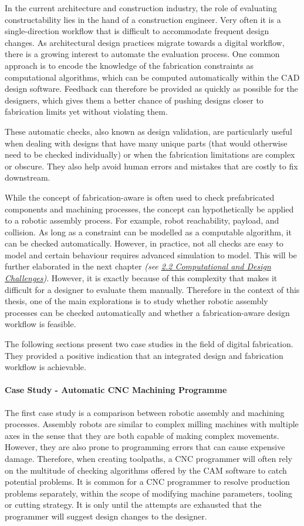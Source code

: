 \documentclass[11pt]{book}
\begin{document}
In the current architecture and construction industry, the role of evaluating constructability lies in the hand of a construction engineer. Very often it is a single-direction workflow that is difficult to accommodate frequent design changes. As architectural design practices migrate towards a digital workflow, there is a growing interest to automate the evaluation process. One common approach is to encode the knowledge of the fabrication constraints as computational algorithms, which can be computed automatically within the CAD design software. Feedback can therefore be provided as quickly as possible for the designers, which gives them a better chance of pushing designs closer to fabrication limits yet without violating them. 

These automatic checks, also known as design validation, are particularly useful when dealing with designs that have many unique parts (that would otherwise need to be checked individually) or when the fabrication limitations are complex or obscure. They also help avoid human errors and mistakes that are costly to fix downstream. 

While the concept of fabrication-aware is often used to check prefabricated components and machining processes, the concept can hypothetically be applied to a robotic assembly process. For example, robot reachability, payload, and collision. As long as a constraint can be modelled as a computable algorithm, it can be checked automatically. However, in practice, not all checks are easy to model and certain behaviour requires advanced simulation to model. This will be further elaborated in the next chapter \textit{(see \uline{2.2 Computational and Design Challenges})}. However, it is exactly because of this complexity that makes it difficult for a designer to evaluate them manually. Therefore in the context of this thesis, one of the main explorations is to study whether robotic assembly processes can be checked automatically and whether a fabrication-aware design workflow is feasible. 

The following sections present two case studies in the field of digital fabrication. They provided a positive indication that an integrated design and fabrication workflow is achievable.

\paragraph{Case Study - Automatic CNC Machining Programme}

The first case study is a comparison between robotic assembly and machining processes. Assembly robots are similar to complex milling machines with multiple axes in the sense that they are both capable of making complex movements. However, they are also prone to programming errors that can cause expensive damage. Therefore, when creating toolpaths, a CNC programmer will often rely on the multitude of checking algorithms offered by the CAM software to catch potential problems. It is common for a CNC programmer to resolve production problems separately, within the scope of modifying machine parameters, tooling or cutting strategy. It is only until the attempts are exhausted that the programmer will suggest design changes to the designer. 
\end{document}
